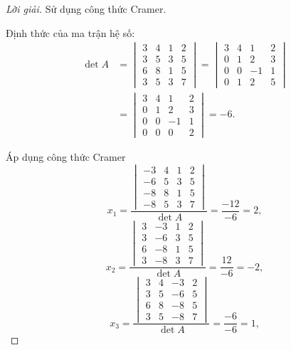 \documentclass[class=linear-algebra,crop=false]{standalone}
\begin{document}
\begin{proof}[Lời giải]
	\par Sử dụng công thức Cramer.
	\par Định thức của ma trận hệ số:
	\begingroup{}
	\allowdisplaybreaks{}
	\begin{align*}
		\det A & =
		\begin{vmatrix}
			3 & 4 & 1 & 2 \\
			3 & 5 & 3 & 5 \\
			6 & 8 & 1 & 5 \\
			3 & 5 & 3 & 7
		\end{vmatrix}
		=
		\begin{vmatrix}
			3 & 4 & 1  & 2 \\
			0 & 1 & 2  & 3 \\
			0 & 0 & -1 & 1 \\
			0 & 1 & 2  & 5
		\end{vmatrix} \\
		       & =
		\begin{vmatrix}
			3 & 4 & 1  & 2 \\
			0 & 1 & 2  & 3 \\
			0 & 0 & -1 & 1 \\
			0 & 0 & 0  & 2
		\end{vmatrix}
		= -6.
	\end{align*}
	\endgroup{}
	\par Áp dụng công thức Cramer
	\[
		x_{1} = \dfrac{
			\begin{vmatrix}
				-3 & 4 & 1 & 2 \\
				-6 & 5 & 3 & 5 \\
				-8 & 8 & 1 & 5 \\
				-8 & 5 & 3 & 7
			\end{vmatrix}
		}{\det A} = \dfrac{-12}{-6} = 2,
	\]
	\[
		x_{2} = \dfrac{
			\begin{vmatrix}
				3 & -3 & 1 & 2 \\
				3 & -6 & 3 & 5 \\
				6 & -8 & 1 & 5 \\
				3 & -8 & 3 & 7
			\end{vmatrix}
		}{\det A} = \dfrac{12}{-6} = -2,
	\]
	\[
		x_{3} = \dfrac{
			\begin{vmatrix}
				3 & 4 & -3 & 2 \\
				3 & 5 & -6 & 5 \\
				6 & 8 & -8 & 5 \\
				3 & 5 & -8 & 7
			\end{vmatrix}
		}{\det A} = \dfrac{-6}{-6} = 1,
\]
\end{proof}
\end{document}
